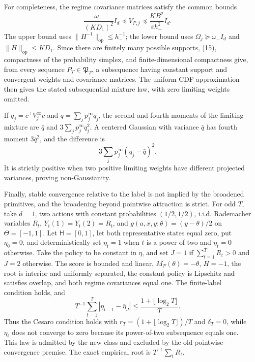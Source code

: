 For completeness, the regime covariance matrices satisfy the common bounds
\[
 \frac{\omega_-}{(KD_1)^2}I_d\preceq V_{P,j}
 \preceq\frac{KB^2}{\varepsilon h_-^2}I_d.
\tag{15}
\]
The upper bound uses \(\|H^{-1}\|_{\mathrm{op}}\le h_-^{-1}\); the lower bound uses \(\Omega_j\succeq\omega_-I_d\) and \(\|H\|_{\mathrm{op}}\le KD_1\). Since there are finitely many possible supports, (15), compactness of the probability simplex, and finite-dimensional compactness give, from every sequence \(P_T\in\mathfrak P_T\), a subsequence having constant support and convergent weights and covariance matrices. The uniform CDF approximation then gives the stated subsequential mixture law, with zero limiting weights omitted.

If \(q_j=c^\top V_j^\infty c\) and \(\bar q=\sum_jp_j^\infty q_j\), the second and fourth moments of the limiting mixture are \(\bar q\) and \(3\sum_jp_j^\infty q_j^2\). A centered Gaussian with variance \(\bar q\) has fourth moment \(3\bar q^2\), and the difference is
\[
 3\sum_jp_j^\infty(q_j-\bar q)^2.
\]
It is strictly positive when two positive limiting weights have different projected variances, proving non-Gaussianity.

Finally, stable convergence relative to the label is not implied by the broadened primitives, and the broadening beyond pointwise attraction is strict. For odd \(T\), take \(d=1\), two actions with constant probabilities \((1/2,1/2)\), i.i.d. Rademacher variables \(R_t\), \(Y_t(1)=Y_t(2)=R_t\), and \(g(a,x,y;\theta)=(y-\theta)/2\) on \(\Theta=[-1,1]\). Let \(\mathsf H=[0,1]\), let both representative states equal zero, put \(\eta_0=0\), and deterministically set \(\eta_t=1\) when \(t\) is a power of two and \(\eta_t=0\) otherwise. Take the policy to be constant in \(\eta\), and set \(J=1\) if \(\sum_{t=1}^TR_t>0\) and \(J=2\) otherwise. The score is bounded and linear, \(M_P(\theta)=-\theta\), \(H=-1\), the root is interior and uniformly separated, the constant policy is Lipschitz and satisfies overlap, and both regime covariances equal one. The finite-label condition holds, and
\[
 T^{-1}\sum_{t=1}^T|\eta_{t-1}-\bar\eta_J|
 \le \frac{1+\lfloor\log_2T\rfloor}{T}.
\]
Thus the Cesaro condition holds with \(r_T=(1+\lfloor\log_2T\rfloor)/T\) and \(\delta_T=0\), while \(\eta_t\) does not converge to zero because its power-of-two subsequence equals one. This law is admitted by the new class and excluded by the old pointwise-convergence premise. The exact empirical root is \(T^{-1}\sum_tR_t\).


